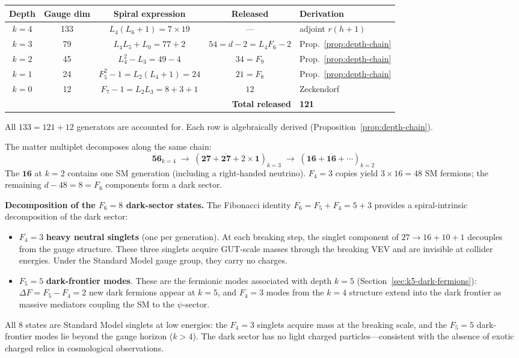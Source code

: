 \documentclass[12pt,a4paper]{article}
\begin{document}
\begin{center}
\begin{tabular}{|c|c|c|c|l|}
\hline
\textbf{Depth} & \textbf{Gauge dim} & \textbf{Spiral expression} & \textbf{Released} & \textbf{Derivation} \\
\hline
$k=4$ & 133 & $L_4(L_6{+}1) = 7 \times 19$ & --- & adjoint $r(h{+}1)$ \\
$k=3$ & 79 & $L_4 L_5 {+} L_0 = 77 {+} 2$ & $54 = d{-}2 = L_4 F_6{-}2$ & Prop.~\ref{prop:depth-chain} \\
$k=2$ & 45 & $L_4^2 {-} L_3 = 49 {-} 4$ & $34 = F_9$ & Prop.~\ref{prop:depth-chain} \\
$k=1$ & 24 & $F_5^2 {-} 1 = L_2(L_4{+}1) = 24$ & $21 = F_8$ & Prop.~\ref{prop:depth-chain} \\
$k=0$ & 12 & $F_7 {-} 1 = L_2 L_3 = 8{+}3{+}1$ & $12$ & Zeckendorf \\
\hline
\multicolumn{4}{|r|}{\textbf{Total released}} & \textbf{121} \\
\hline
\end{tabular}
\end{center}
All $133 = 121 + 12$ generators are accounted for. Each row is algebraically derived (Proposition~\ref{prop:depth-chain}).

The matter multiplet decomposes along the same chain:
\begin{equation}
\mathbf{56}_{k=4} \;\to\; (\mathbf{27} + \overline{\mathbf{27}} + 2\times\mathbf{1})_{k=3} \;\to\; (\mathbf{16} + \overline{\mathbf{16}} + \cdots)_{k=2}
\end{equation}
The $\mathbf{16}$ at $k = 2$ contains one SM generation (including a right-handed neutrino). $F_4 = 3$ copies yield $3 \times 16 = 48$ SM fermions; the remaining $d - 48 = 8 = F_6$ components form a dark sector.

\noindent \textbf{Decomposition of the $F_6 = 8$ dark-sector states.} The Fibonacci identity $F_6 = F_5 + F_4 = 5 + 3$ provides a spiral-intrinsic decomposition of the dark sector:
\begin{itemize}
\item $F_4 = 3$ \textbf{heavy neutral singlets} (one per generation). At each breaking step, the singlet component of $27 \to 16 + 10 + 1$ decouples from the gauge structure. These three singlets acquire GUT-scale masses through the breaking VEV and are invisible at collider energies. Under the Standard Model gauge group, they carry no charges.
\item $F_5 = 5$ \textbf{dark-frontier modes}. These are the fermionic modes associated with depth $k = 5$ (Section~\ref{sec:k5-dark-fermions}): $\Delta F = F_5 - F_4 = 2$ new dark fermions appear at $k = 5$, and $F_4 = 3$ modes from the $k = 4$ structure extend into the dark frontier as massive mediators coupling the SM to the $\psi$-sector.
\end{itemize}
All 8 states are Standard Model singlets at low energies: the $F_4 = 3$ singlets acquire mass at the breaking scale, and the $F_5 = 5$ dark-frontier modes lie beyond the gauge horizon ($k > 4$). The dark sector has no light charged particles---consistent with the absence of exotic charged relics in cosmological observations.
\end{document}
